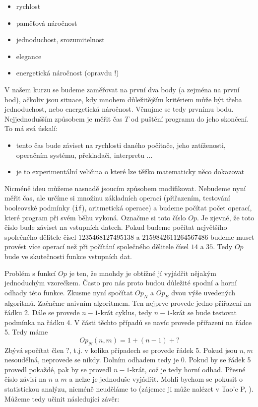 \begin{itemize}
 \item rychlost
 \item paměťová náročnost
 \item jednoduchost, srozumitelnost
 \item elegance
 \item energetická náročnost (opravdu !)
\end{itemize}

V našem kurzu se budeme zaměřovat na první dva body (a zejména na první bod), ačkoliv jsou situace, kdy mnohem důležitějším
kritériem může být třeba jednoduchost, nebo energetická náročnost. Věnujme se tedy prvnímu bodu. Nejjednodušším způsobem
je měřit čas $T$ od puštění programu do jeho skončení. To má svá úskalí:

\begin{itemize}
 \item tento čas bude záviset na rychlosti daného počítače, jeho zatíženosti, operačním systému, překladači, interpretu ...
 \item je to experimentální veličina o které lze těžko matematicky něco dokazovat
\end{itemize}

Nicméně ideu můžeme nasnadě jsoucím způsobem modifikovat. Nebudeme nyní měřit čas, ale určíme si množinu základních
operací (přiřazením, testování booleovské podmínky ({\tt if}), aritmetická operace) a budeme počítat počet operací, 
které program při svém běhu vykoná. Označme si toto číslo $Op$. Je zjevné, že 
toto číslo bude záviset na vstupních datech. Pokud budeme počítat největšího společného dělitele čísel
$1235468127495138$ a $2159842611264567486$ budeme muset provést více operací než při počítání společného dělitele čísel
$14$ a $35$. Tedy $Op$ bude ve skutečnosti funkce vstupních dat.

Problém s funkcí $Op$ je ten, že mnohdy je obtížné jí vyjádřit nějakým jednoduchým vzorečkem. Často pro nás proto budou
důležité spodní a horní odhady této funkce. Zkusme nyní spočítat $Op_N$ a $Op_E$ dvou výše uvedených algoritmů. Začněme
naivním algoritmem. Ten nejprve provede jedno přiřazení na řádku 2. Dále se provede $n-1$-krát cyklus, tedy $n-1$-krát
se bude testovat podmínka na řádku 4. V části těchto případů se navíc provede přiřazení na řádce 5. Tedy máme
\begin{displaymath}
 Op_N(n,m) = 1 + (n-1) + ?
\end{displaymath}
Zbývá spočítat člen $?$, t.j. v kolika případech se provede řádek 5. Pokud jsou $n,m$ nesoudělná, neprovede se nikdy.
Dolním odhadem tedy je $0$. Pokud by se řádek 5 provedl pokaždé, pak by se provedl $n-1$-krát, což je tedy horní odhad.
Přesné číslo závisí na $n$ a $m$ a nelze je jednoduše vyjádřit. Mohli bychom se pokusit o statistickou analýzu, nicméně
neuděláme to (zájemce ji může nalézet v Tao'c P, \cite{TAOCP2}). Můžeme tedy učinit následující závěr:

